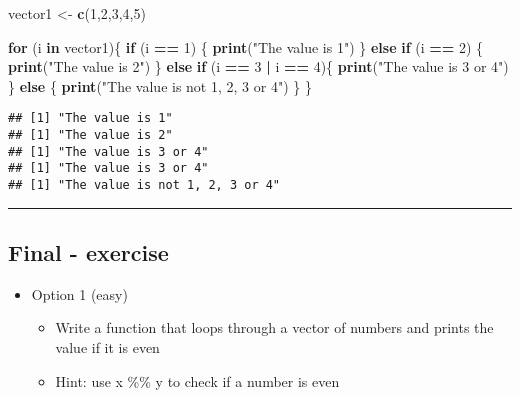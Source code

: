 \documentclass[]{article}
\newenvironment{Shaded}{\begin{snugshade}}{\end{snugshade}}
\newcommand{\ControlFlowTok}[1]{\textcolor[rgb]{0.13,0.29,0.53}{\textbf{#1}}}
\newcommand{\DecValTok}[1]{\textcolor[rgb]{0.00,0.00,0.81}{#1}}
\newcommand{\KeywordTok}[1]{\textcolor[rgb]{0.13,0.29,0.53}{\textbf{#1}}}
\newcommand{\NormalTok}[1]{#1}
\newcommand{\OperatorTok}[1]{\textcolor[rgb]{0.81,0.36,0.00}{\textbf{#1}}}
\newcommand{\StringTok}[1]{\textcolor[rgb]{0.31,0.60,0.02}{#1}}
\providecommand{\tightlist}{%
  \setlength{\itemsep}{0pt}\setlength{\parskip}{0pt}}
\begin{document}
\begin{Shaded}
\begin{Highlighting}[]
\NormalTok{vector1 <-}\StringTok{ }\KeywordTok{c}\NormalTok{(}\DecValTok{1}\NormalTok{,}\DecValTok{2}\NormalTok{,}\DecValTok{3}\NormalTok{,}\DecValTok{4}\NormalTok{,}\DecValTok{5}\NormalTok{)}

\ControlFlowTok{for}\NormalTok{ (i }\ControlFlowTok{in}\NormalTok{ vector1)\{}
  \ControlFlowTok{if}\NormalTok{ (i }\OperatorTok{==}\StringTok{ }\DecValTok{1}\NormalTok{) \{}
    \KeywordTok{print}\NormalTok{(}\StringTok{"The value is 1"}\NormalTok{)}
\NormalTok{  \} }\ControlFlowTok{else} \ControlFlowTok{if}\NormalTok{ (i }\OperatorTok{==}\StringTok{ }\DecValTok{2}\NormalTok{) \{}
    \KeywordTok{print}\NormalTok{(}\StringTok{"The value is 2"}\NormalTok{)}
\NormalTok{  \} }\ControlFlowTok{else} \ControlFlowTok{if}\NormalTok{ (i }\OperatorTok{==}\StringTok{ }\DecValTok{3} \OperatorTok{|}\StringTok{ }\NormalTok{i }\OperatorTok{==}\StringTok{ }\DecValTok{4}\NormalTok{)\{}
    \KeywordTok{print}\NormalTok{(}\StringTok{"The value is 3 or 4"}\NormalTok{)}
\NormalTok{  \} }\ControlFlowTok{else}\NormalTok{ \{}
    \KeywordTok{print}\NormalTok{(}\StringTok{"The value is not 1, 2, 3 or 4"}\NormalTok{)}
\NormalTok{  \}}
\NormalTok{\}}
\end{Highlighting}
\end{Shaded}

\begin{verbatim}
## [1] "The value is 1"
## [1] "The value is 2"
## [1] "The value is 3 or 4"
## [1] "The value is 3 or 4"
## [1] "The value is not 1, 2, 3 or 4"
\end{verbatim}

\begin{center}\rule{0.5\linewidth}{\linethickness}\end{center}

\hypertarget{final---exercise}{%
\subsection{Final - exercise}\label{final---exercise}}

\begin{itemize}
\tightlist
\item
  Option 1 (easy)

  \begin{itemize}
  \tightlist
  \item
    Write a function that loops through a vector of numbers and prints
    the value if it is even
  \item
    Hint: use x \%\% y to check if a number is even
  \end{itemize}
\end{itemize}
\end{document}
